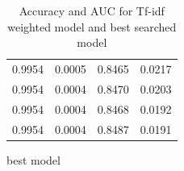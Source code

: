 \begin{table}
\begin{subtable}{.5\linewidth}
\begin{tabular}{cccc}
      0.9954          & 0.0005        & 0.8465          & 0.0217 \\
      0.9954          & 0.0004        & 0.8470          & 0.0203 \\
      0.9954          & 0.0004        & 0.8468          & 0.0192 \\
      0.9954          & 0.0004        & 0.8487          & 0.0191 \\ \bottomrule
    \end{tabular}
      \caption{best model}
      \label{tab:best-model}
  \end{subtable}
\caption{Accuracy and AUC for Tf-idf weighted model and best searched model}
\label{tab:all-data-tables}
\end{table}

